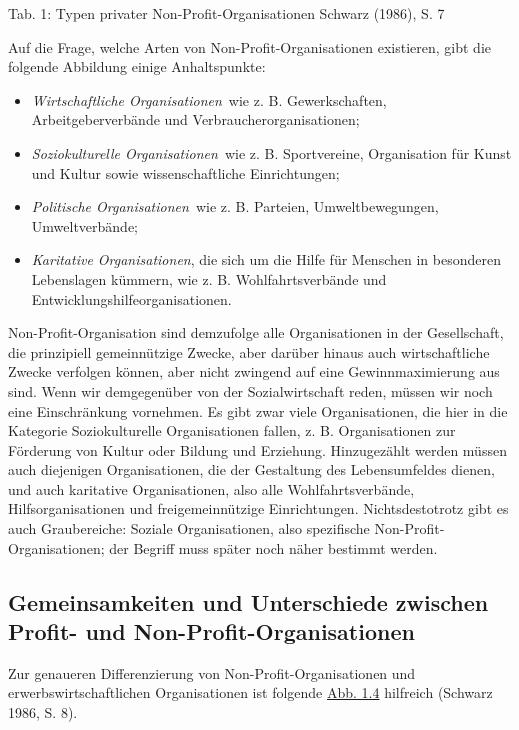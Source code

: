 \documentclass[
  letterpaper,
]{book}
\providecommand{\tightlist}{%
  \setlength{\itemsep}{0pt}\setlength{\parskip}{0pt}}\usepackage{longtable,booktabs,array}
\begin{document}
Tab. 1: Typen privater Non-Profit-Organisationen
\label{table1}{Schwarz (1986), S. 7}

Auf die Frage, welche Arten von Non-Profit-Organisationen existieren,
gibt die folgende Abbildung einige Anhaltspunkte:

\begin{itemize}
\tightlist
\item
  \emph{Wirtschaftliche Organisationen}~wie z. B. Gewerkschaften,
  Arbeitgeberverbände und Verbraucherorganisationen;
\end{itemize}

\begin{itemize}
\item
  \emph{Soziokulturelle Organisationen}~wie z. B. Sportvereine,
  Organisation für Kunst und Kultur sowie wissenschaftliche
  Einrichtungen;
\item
  \emph{Politische Organisationen}~wie z. B. Parteien, Umweltbewegungen,
  Umweltverbände;
\item
  \emph{Karitative Organisationen}, die sich um die Hilfe für Menschen
  in besonderen Lebenslagen kümmern, wie z. B. Wohlfahrtsverbände und
  Entwicklungshilfeorganisationen.
\end{itemize}

Non-Profit-Organisation sind demzufolge alle Organisationen in der
Gesellschaft, die prinzipiell gemeinnützige Zwecke, aber darüber hinaus
auch wirtschaftliche Zwecke verfolgen können, aber nicht zwingend auf
eine Gewinnmaximierung aus sind. Wenn wir demgegenüber von der
Sozialwirtschaft reden, müssen wir noch eine Einschränkung vornehmen. Es
gibt zwar viele Organisationen, die hier in die Kategorie
Soziokulturelle Organisationen fallen, z. B. Organisationen zur
Förderung von Kultur oder Bildung und Erziehung. Hinzugezählt werden
müssen auch diejenigen Organisationen, die der Gestaltung des
Lebensumfeldes dienen, und auch karitative Organisationen, also alle
Wohlfahrtsverbände, Hilfsorganisationen und freigemeinnützige
Einrichtungen. Nichtsdestotrotz gibt es auch Graubereiche: Soziale
Organisationen, also spezifische Non-Profit-Organisationen; der Begriff
muss später noch näher bestimmt werden.

\subsection{Gemeinsamkeiten und Unterschiede zwischen Profit- und
Non-Profit-Organisationen}\label{vergleichnpo}

Zur genaueren Differenzierung von Non-Profit-Organisationen und
erwerbswirtschaftlichen Organisationen ist folgende
\hyperref[figure14]{Abb. 1.4} hilfreich (Schwarz 1986, S. 8).
\end{document}
